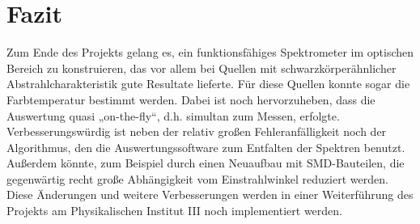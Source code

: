 \documentclass[11pt]{scrartcl}
\begin{document}
\section{Fazit}
Zum Ende des Projekts gelang es, ein funktionsfähiges Spektrometer im optischen Bereich zu konstruieren, das vor allem bei Quellen mit schwarzkörperähnlicher Abstrahlcharakteristik gute Resultate lieferte. Für diese Quellen konnte sogar die Farbtemperatur bestimmt werden. Dabei ist noch hervorzuheben, dass die Auswertung quasi „on-the-fly“, d.h. simultan zum Messen, erfolgte.
Verbesserungswürdig ist neben der relativ großen Fehleranfälligkeit noch der Algorithmus, den die Auswertungssoftware zum Entfalten der Spektren benutzt. Außerdem könnte, zum Beispiel durch einen Neuaufbau mit SMD-Bauteilen, die gegenwärtig recht große Abhängigkeit vom Einstrahlwinkel reduziert werden. Diese Änderungen und weitere Verbesserungen werden in einer Weiterführung des Projekts am Physikalischen Institut III noch implementiert werden.
\end{document}
